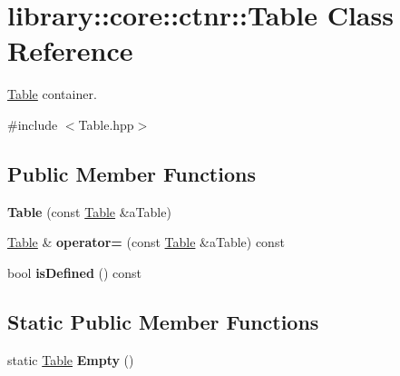 \hypertarget{classlibrary_1_1core_1_1ctnr_1_1_table}{}\section{library\+:\+:core\+:\+:ctnr\+:\+:Table Class Reference}
\label{classlibrary_1_1core_1_1ctnr_1_1_table}


\hyperlink{classlibrary_1_1core_1_1ctnr_1_1_table}{Table} container.  




{\ttfamily \#include $<$Table.\+hpp$>$}

\subsection*{Public Member Functions}
\begin{DoxyCompactItemize}
\item 
\mbox{\label{classlibrary_1_1core_1_1ctnr_1_1_table_afaaf450a1a4949b48b6290460137921e}} 
{\bfseries Table} (const \hyperlink{classlibrary_1_1core_1_1ctnr_1_1_table}{Table} \&a\+Table)
\item 
\mbox{\label{classlibrary_1_1core_1_1ctnr_1_1_table_af1d446ec74df66da7bd1eb3ff2d6bb55}} 
\hyperlink{classlibrary_1_1core_1_1ctnr_1_1_table}{Table} \& {\bfseries operator=} (const \hyperlink{classlibrary_1_1core_1_1ctnr_1_1_table}{Table} \&a\+Table) const
\item 
\mbox{\label{classlibrary_1_1core_1_1ctnr_1_1_table_af2777d4233cd7caa7cc81b3b957c3a0c}} 
bool {\bfseries is\+Defined} () const
\end{DoxyCompactItemize}
\subsection*{Static Public Member Functions}
\begin{DoxyCompactItemize}
\item 
\mbox{\label{classlibrary_1_1core_1_1ctnr_1_1_table_a75089c496f8aac71e374616d55a78e03}} 
static \hyperlink{classlibrary_1_1core_1_1ctnr_1_1_table}{Table} {\bfseries Empty} ()
\end{DoxyCompactItemize}
